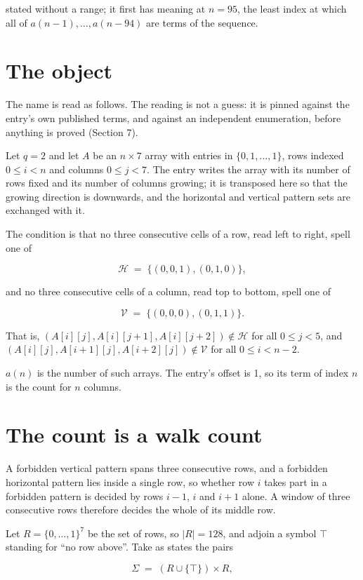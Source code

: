 \documentclass[11pt]{article}
\theoremstyle{definition}
\begin{document}
stated without a range; it first has meaning at $n = 95$, the least index at which all of $a(n-1),\dots,a(n-94)$ are terms of the sequence.

\section{The object}

The name is read as follows. The reading is not a guess: it is pinned against the entry's own published terms, and against an independent enumeration, before anything is proved (Section 7).

Let $q = 2$ and let $A$ be an $n \times 7$ array with entries in $\{0,1,\dots,1\}$, rows indexed $0 \le i < n$ and columns $0 \le j < 7$. The entry writes the array with its number of rows fixed and its number of columns growing; it is transposed here so that the growing direction is downwards, and the horizontal and vertical pattern sets are exchanged with it.

The condition is that no three consecutive cells of a row, read left to right, spell one of

\[\mathcal{H} \;=\; \{(0,0,1), (0,1,0)\},\]

and no three consecutive cells of a column, read top to bottom, spell one of

\[\mathcal{V} \;=\; \{(0,0,0), (0,1,1)\}.\]

That is, $(A[i][j],A[i][j{+}1],A[i][j{+}2]) \notin \mathcal{H}$ for all $0 \le j < 5$, and $(A[i][j],A[i{+}1][j],A[i{+}2][j]) \notin \mathcal{V}$ for all $0 \le i < n-2$.

$a(n)$ is the number of such arrays. The entry's offset is 1, so its term of index $n$ is the count for $n$ columns.

\section{The count is a walk count}

A forbidden vertical pattern spans three consecutive rows, and a forbidden horizontal pattern lies inside a single row, so whether row $i$ takes part in a forbidden pattern is decided by rows $i-1$, $i$ and $i+1$ alone. A window of three consecutive rows therefore decides the whole of its middle row.

Let $R = \{0,\dots,1\}^{7}$ be the set of rows, so $|R| = 128$, and adjoin a symbol $\top$ standing for ``no row above''. Take as states the pairs

\[\Sigma \;=\; (R \cup \{\top\}) \times R,\]
\end{document}
